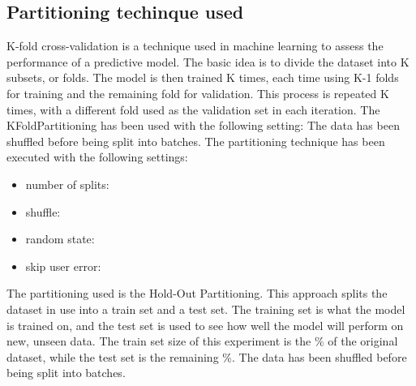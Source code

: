 \documentclass[11pt]{article}
\begin{document}
\subsection{Partitioning techinque used}\label{subsec:partitioning}
K-fold cross-validation is a technique used in machine learning to assess the performance of a predictive model.
The basic idea is to divide the dataset into K subsets, or folds.
The model is then trained K times, each time using K-1 folds for training and the remaining fold for validation.
This process is repeated K times, with a different fold used as the validation set in each iteration.
\hfill\break
\hfill\break
The KFoldPartitioning has been used with the following setting:
\hfill\break
\hfill\break
{}
The data has been shuffled before being split into batches.
The partitioning technique has been executed with the following settings:
\begin{itemize}
    \item number of splits: 
    \item shuffle: 
    \item random state: 
    \item skip user error: 
\end{itemize}
\hfill\break
\hfill\break


The partitioning used is the Hold-Out Partitioning.
This approach splits the dataset in use into a train set and a test set.
The training set is what the model is trained on, and the test set is used to see how
well the model will perform on new, unseen data.
\hfill\break
\hfill\break
The train set size of this experiment is the \%
of the original dataset, while the test set is the remaining \%.
\hfill\break
\hfill\break
{}
The data has been shuffled before being split into batches.
\hfill\break
\hfill\break
\end{document}

